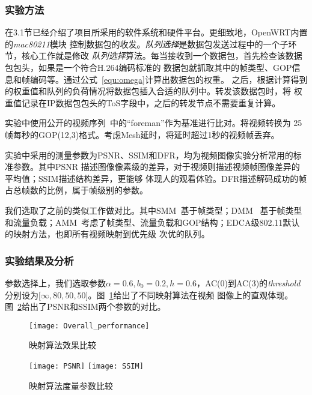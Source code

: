 \subsubsection{实验方法}
在3.1节已经介绍了项目所采用的软件系统和硬件平台。更细致地，OpenWRT内置的\emph{mac80211}模块
控制数据包的收发。\emph{队列选择}是数据包发送过程中的一个子环节，核心工作就是修改\emph{
队列选择}算法。每当接收到一个数据包，首先检查该数据包包头，如果是一个符合H.264编码标准的
数据包就抓取其中的帧类型、GOP信息和帧编码等。通过公式~\ref{equ:omega}计算出数据包的权重。
之后，根据计算得到的权重值和队列的负荷情况将数据包插入合适的队列中。转发该数据包时，将
权重值记录在IP数据包包头的ToS字段中，之后的转发节点不需要重复计算。

实验中使用公开的视频序列~\cite{videos}中的“foreman”作为基准进行比对。将视频转换为
25帧每秒的GOP(12,3)格式。考虑Mesh延时，将延时超过1秒的视频帧丢弃。

实验中采用的测量参数为PSNR、SSIM和DFR，均为视频图像实验分析常用的标准参数。其中PSNR
描述图像像素级的差异，对于视频则描述视频帧图像差异的平均值；SSIM描述结构差异，更能够
体现人的观看体验。DFR描述解码成功的帧占总帧数的比例，属于帧级别的参数。

我们选取了之前的类似工作做对比。其中SMM~\cite{SMM}基于帧类型；DMM~\cite{DMM}
基于帧类型和流量负载；AMM~\cite{AMM}考虑了帧类型、流量负载和GOP结构；EDCA级802.11默认的映射方法，也即所有视频映射到优先级
次优的队列。

\subsubsection{实验结果及分析}
参数选择上，我们选取参数$\alpha=0.6, b_{0}=0.2, h=0.6$，AC(0)到AC(3)的\emph{threshold}
分别设为$\lbrack\infty, 80, 50, 50\rbrack$。图~\ref{fig:overall_performance}给出了不同映射算法在视频
图像上的直观体现。图~\ref{fig:parameters}给出了PSNR和SSIM两个参数的对比。

\begin{figure}[H] %
  \centering
  \texttt{[image: Overall\_performance]}
  \caption{映射算法效果比较}
  \label{fig:overall_performance}
\end{figure}

\begin{figure}[h]
  \centering
  \subcaptionbox{}
      {\texttt{[image: PSNR]}}
  \hspace{1em}
  \subcaptionbox{}
    {\texttt{[image: SSIM]}}
  \caption{映射算法度量参数比较}
  \label{fig:parameters}
\end{figure}

